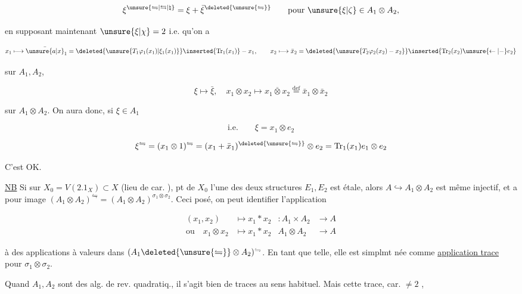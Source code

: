 
\[
\xi^{\unsure{\leftrightharpoons|\leftrightarrows|\natural}}=\xi+\bar\xi^{\deleted{\unsure{\leftrightharpoons}}}\qquad\text{pour }\unsure{\xi|\zeta}\in A_1\otimes A_2,
\]

en supposant maintenant $\unsure{\xi|\chi}=2$ i.e. qu'on a

\[
x_1\longmapsto\bar{\unsure{a|x}}_1=
\deleted{\unsure{T_1\varphi_1(x_1)|\xi_1(x_1)}}\inserted{\mathrm{Tr}_1(x_1)}-x_1,\qquad
x_2\longmapsto\bar x_2=\deleted{\unsure{T_2\varphi_2(x_2)-x_2}}
\inserted{\mathrm{Tr}_2(x_2)\unsure{\leftarrow|-}e_2}
\]

sur $A_1,A_2$, 

\[
\xi\longmapsto\bar\xi,\quad
x_1\otimes x_2\longmapsto\overline{x_1\otimes x_2}
\overset{\mathrm{def}}{=}\bar x_1\otimes\bar x_2
\]

sur $A_1\otimes A_2$. On aura donc, si $\xi\in A_1$

\[
\text{i.e.}\qquad \xi=x_1\otimes e_2
\]

\[
\xi^{\leftrightharpoons}=(x_1\otimes1)^{\leftrightharpoons}=(x_1+\bar x_1)^{\deleted{\unsure{\leftrightharpoons}}}\otimes e_2
=\mathrm{Tr}_1(x_1)e_1\otimes e_2
\]

C'est OK.

\uline{NB} Si  sur $X_0=V(2.1_X)\subset X$ (lieu de car. ),   pt de $X_0$ l'une des deux structures $E_1,E_2$ est étale, alors $A\hookrightarrow A_1\otimes A_2$ est même injectif, et a pour image $(A_1\otimes A_2)^{\leftrightharpoons}=(A_1\otimes A_2)^{\sigma_1\otimes\sigma_2}$. Ceci posé, on peut  identifier l'application

\[
\begin{aligned}
(x_1,x_2)&\longmapsto x_1*x_2 &: A_1\times A_2&\longrightarrow A\\
\text{ou}\quad x_1\otimes x_2&\longmapsto x_1*x_2 & A_1\otimes A_2&\longrightarrow A
\end{aligned}
\]

à des applications à valeurs dans $(A_1\deleted{\unsure{\leftrightharpoons}}\otimes A_2)^{\leftrightharpoons}$. En tant que telle, elle est simplmt née comme \uline{application trace} pour $\sigma_1\otimes\sigma_2$.

Quand $A_1,A_2$ sont des alg. de rev. quadratiq., il s'agit bien de traces au sens habituel. Mais cette trace,  car. $\ne2$ ,


